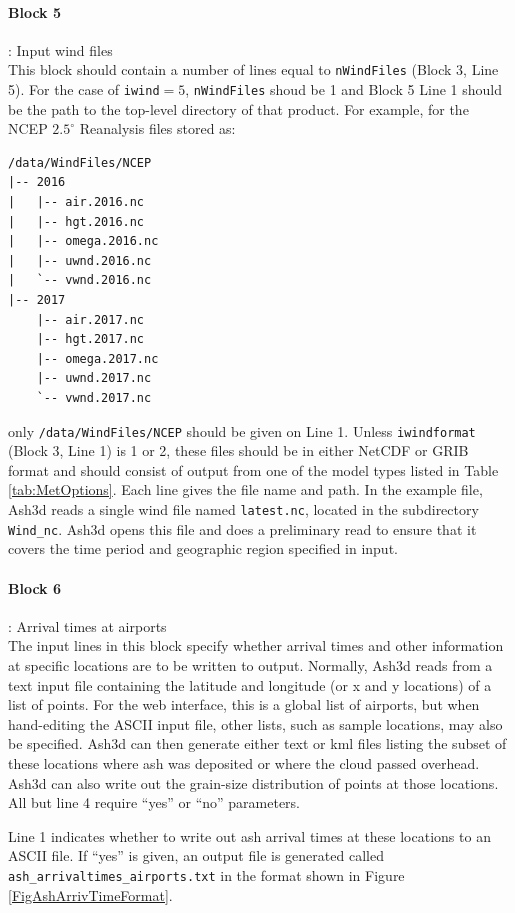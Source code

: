 \paragraph{Block 5}: Input wind files\\
This block should contain a number of lines equal to \texttt{nWindFiles} (Block 3, Line 5).
For the case of \texttt{iwind}$=5$, \texttt{nWindFiles} shoud be 1 and Block 5 Line 1
should be the path to the top-level directory of that product. For example, for the
NCEP $2.5^{\circ}$ Reanalysis files stored as:
\begin{verbatim}
/data/WindFiles/NCEP
|-- 2016
|   |-- air.2016.nc
|   |-- hgt.2016.nc
|   |-- omega.2016.nc
|   |-- uwnd.2016.nc
|   `-- vwnd.2016.nc
|-- 2017
    |-- air.2017.nc
    |-- hgt.2017.nc
    |-- omega.2017.nc
    |-- uwnd.2017.nc
    `-- vwnd.2017.nc
\end{verbatim}
only \texttt{/data/WindFiles/NCEP} should be given on Line 1.
Unless \texttt{iwindformat} (Block 3, Line 1) is 1 or 2, these files should be in
either NetCDF or GRIB
format and should consist of output from one of the model types listed in
Table \ref{tab:MetOptions}.
Each line gives the file name and path. In the example file, Ash3d reads a single
wind file named \texttt{latest.nc}, located in the subdirectory \texttt{Wind\_nc}.
Ash3d opens this
file and does a preliminary read to ensure that it covers the time period and
geographic region specified in input.

\paragraph{Block 6}: Arrival times at airports\\
The input lines in this block specify whether arrival times and other information
at specific locations are to be written to output. Normally, Ash3d reads from a
text input file containing the latitude and longitude (or x and y locations) of
a list of points. For the web interface, this is a global list of airports, but
when hand-editing the ASCII input file, other lists, such as sample locations, may
also be specified. Ash3d can then generate either text or kml files listing the
subset of these locations where ash was deposited or where the cloud passed overhead.
Ash3d can also write out the grain-size distribution of points at those locations.
All but line 4 require ``yes'' or ``no'' parameters.

Line 1 indicates whether to write out ash arrival times at these locations to an
ASCII file. If ``yes'' is given, an output file is generated called
\texttt{ash\_arrivaltimes\_airports.txt}
in the format shown in Figure \ref{FigAshArrivTimeFormat}.

